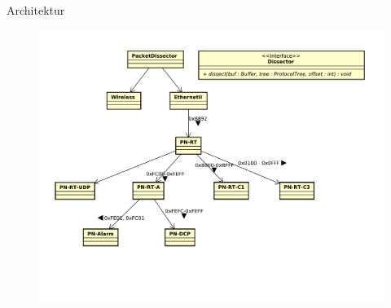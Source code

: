 \begin{frame}{Architektur}
    \begin{figure}
    	\centering
    	\includegraphics[width=\textwidth]{./images/dissector/6.pdf}
    \end{figure}
\end{frame}
